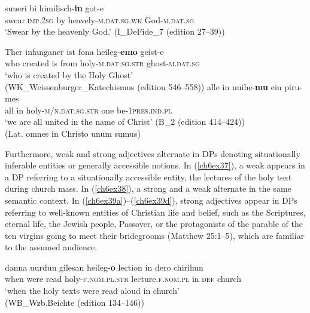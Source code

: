 \documentclass[output=paper,colorlinks,citecolor=brown]{langscibook}
\begin{document}
\begin{exe}
\ex\label{ch6ex35}
\gll suueri bi himilisch-\textbf{in} got-e\\
swear.\textsc{imp.2sg} by heavely-\textsc{m.dat.sg.wk} God-\textsc{m.dat.sg}\\
\glt`Swear by the heavenly God.' (I\_DeFide\_7 (edition 27--39))
\end{exe}

\begin{exe}
\ex\label{ch6ex36}\begin{xlist}
\ex\label{ch6ex36a}
\gll  Ther infanganer ist fona heileg-\textbf{emo} geist-e\\
who created is from holy-\textsc{m.dat.sg.str} ghost-\textsc{m.dat.sg}\\
\glt `who is created by the Holy Ghost'\\(WK\_Weissenburger\_Katechismus (edition 546--558))
\ex\label{ch6ex36b} 
\gll alle in uuihe-\textbf{mu} ein piru-mes\\
all in holy-\textsc{m/n.dat.sg.str} one be-\textsc{1pres.ind.pl}\\
\glt `we are all united in the name of Christ' (B\_2 (edition 414--424))\\
(Lat. omnes in Christo unum sumus)
\end{xlist}
\end{exe}

Furthermore, weak and strong adjectives alternate in DPs denoting
situationally inferable entities or generally accessible notions. In
(\ref{ch6ex37}), a weak  appears in a DP referring to a situationally
accessible entity, the lectures of the holy text during church mass. In
(\ref{ch6ex38}), a strong and a weak  alternate in the same semantic
context. In (\ref{ch6ex39a})--(\ref{ch6ex39d}), strong adjectives appear in DPs referring to
well-known entities of Christian life and belief, such as the
Scriptures, eternal life, the Jewish people, Passover, or the
protagonists of the parable of the ten virgins going to meet their
bridegrooms (Matthew 25:1--5), which are familiar to the assumed
audience.

\begin{exe}
\ex\label{ch6ex37}
\gll danna uurdun gilesan heileg-\textbf{o} lection in dero chirihun\\
 when were read holy-\textsc{f.nom.pl.str} lecture.\textsc{f.nom.pl} in \textsc{def} church\\
\glt `when the holy texts were read aloud in church'\\(WB\_Wzb.Beichte (edition 134--146))
\end{exe}
\end{document}
